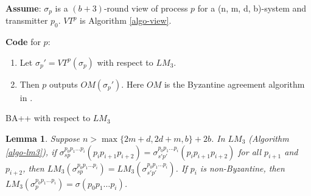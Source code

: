 \documentclass[11pt,conference,compsoc,onecolumn,romanappendices]{IEEEtran}
\newcommand{\tmstrong}[1]{\textbf{#1}}
\newenvironment{enumeratenumeric}{\begin{enumerate}[1.] }{\end{enumerate}}
\newenvironment{fkindent}{\begin{tmparmod}{0.0em}{1.0em}{0pt} }{\end{tmparmod}}
\newenvironment{tmparmod}[3]{\begin{list}{}{\setlength{\topsep}{0pt}\setlength{\leftmargin}{#1}\setlength{\rightmargin}{#2}\setlength{\parindent}{#3}\setlength{\listparindent}{\parindent}\setlength{\itemindent}{\parindent}\setlength{\parsep}{\parskip}} \item[]}{\end{list}}
\newtheorem{lemma}{Lemma}
\begin{document}
\begin{algorithm}[p]\label{algo-bapp}
  {\tmstrong{Assume}}: $\sigma_p$ is a $(b + 3)$-round view of process $p$ for
  a (n, m, d, b)-system and transmitter $p_0$. $V T^p$ is Algorithm
  \ref{algo-view}.{\hspace*{\fill}}
  
  {\tmstrong{Code}} for $p$:{\hspace*{\fill}}
  \begin{fkindent}
  \begin{enumeratenumeric}
    \item Let $\sigma_p' = V T^p (\sigma_p)$ with respect to $L M_3$.
    
    \item Then $p$ outputs $O M (\sigma_p')$. Here $O M$ is the Byzantine
    agreement algorithm in \cite{lamport1982byzantine}.
  \end{enumeratenumeric}
  \end{fkindent}

  \caption{BA++ with respect to $L M_3$}
\end{algorithm}

\begin{lemma}\label{lemma-lm3}
  Suppose $n > \max \{ 2 m + d, 2 d + m, b \} + 2 b$.
  In $L M_3$ (Algorithm \ref{algo-lm3}),
  if $\sigma^{p_0 p_1 \ldots p_i}_{s p} (p_i p_{i+1} p_{i+2}) = \sigma^{p_0 p_1 \ldots p_i}_{s' p'} (p_i p_{i+1} p_{i+2})$ for all $p_{i+1}$ and $p_{i+2}$, then $L M_3 (\sigma^{p_0 p_1 \ldots p_i}_{s p}) = L M_3 (\sigma^{p_0 p_1 \ldots p_i}_{s' p'})$.
  If $p_i$ is non-Byzantine, then $L M_3 (\sigma^{p_0 p_1 \ldots p_i}_{p}) = \sigma (p_0 p_1 \ldots p_i)$.
\end{lemma}
\end{document}
